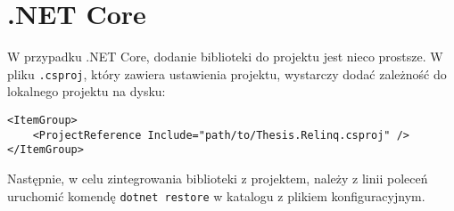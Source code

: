 \section{.NET Core}
W przypadku .NET Core, dodanie biblioteki do projektu jest nieco prostsze. W pliku \texttt{.csproj}, który zawiera ustawienia projektu, wystarczy dodać zależność do lokalnego projektu na dysku:

\begin{lstlisting}
<ItemGroup>
    <ProjectReference Include="path/to/Thesis.Relinq.csproj" />
</ItemGroup>
\end{lstlisting}

Następnie, w celu zintegrowania biblioteki z projektem, należy z linii poleceń uruchomić komendę \texttt{dotnet restore} w katalogu z plikiem konfiguracyjnym.